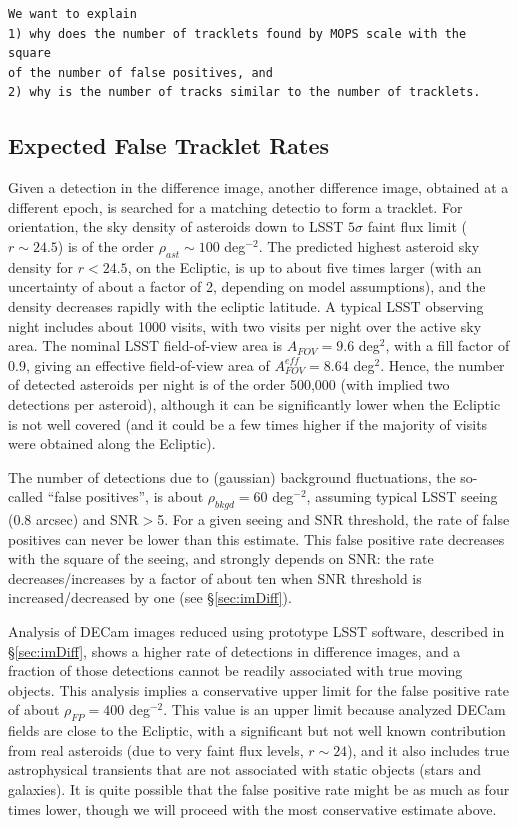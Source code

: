 \begin{verbatim}
We want to explain 
1) why does the number of tracklets found by MOPS scale with the square 
of the number of false positives, and 
2) why is the number of tracks similar to the number of tracklets. 
\end{verbatim}



\subsection{Expected False Tracklet Rates \label{sec:tracklets} }

Given a detection in the difference image,  another difference image, obtained at a different epoch, 
is searched for a matching detectio to form a tracklet. For orientation, the sky 
density of asteroids down to LSST $5\sigma$ faint flux limit ($r \sim 24.5$) is of the order 
$\rho_{ast} \sim 100$ deg$^{-2}$. The predicted highest asteroid sky density for $r<24.5$, 
on the Ecliptic, is up to about five times larger (with an uncertainty of about a factor of 2, 
depending on model assumptions), and the density decreases rapidly with the ecliptic latitude. 
A typical LSST observing night includes about 1000 visits, with two visits per night over 
the active sky area. The nominal LSST field-of-view area is $A_{FOV}=9.6$ deg$^2$, with a 
fill factor of 0.9, giving an effective field-of-view area of $A_{FOV}^{eff}=8.64$ deg$^2$. Hence, 
the number of detected asteroids per night is of the order 500,000 (with implied two detections 
per asteroid), although it can be significantly lower when the Ecliptic is not well covered (and 
it could be a few times higher if the majority of visits were obtained along the Ecliptic). 

The number of detections due to (gaussian) background fluctuations, the so-called ``false 
positives'', is about $\rho_{bkgd} = 60$ deg$^{-2}$, assuming typical LSST seeing (0.8 arcsec) 
and SNR$>$5. For a given seeing and SNR threshold, the rate of false positives can never be 
lower than this estimate. This false positive rate decreases with the square of the seeing, and 
strongly depends on SNR: the rate decreases/increases by a factor of about ten when SNR 
threshold is increased/decreased by one (see \S\ref{sec:imDiff}). 

Analysis of DECam images reduced using prototype LSST software, described in \S\ref{sec:imDiff},  
shows a higher rate of detections in difference images, and a fraction of those detections 
cannot be readily associated with true moving objects. This analysis implies a conservative 
upper limit for the false positive rate of about $\rho_{FP} =  400$ deg$^{-2}$. This value 
is an upper limit because analyzed DECam fields are close to the Ecliptic, with a significant but
not well known contribution from real asteroids (due to very faint flux levels, $r \sim 24$),
and it also includes true astrophysical transients that are not associated with static objects
(stars and galaxies). It is quite possible that the false positive rate might be as much as four 
times lower, though we will proceed with the most conservative estimate above. 

